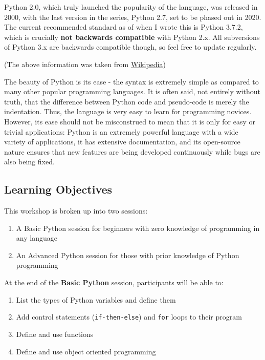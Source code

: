 \documentclass[12pt]{article}
\newcommand{\code}{\texttt}
\begin{document}
Python 2.0, which truly launched the popularity of the language, was released in 2000, with the last version in the series, Python 2.7, set to be phased out in 2020. The current recommended standard as of when I wrote this is Python 3.7.2, which is crucially \textbf{not backwards compatible} with Python 2.x. All subversions of Python 3.x are backwards compatible though, so feel free to update regularly.

(The above information was taken from \href{https://en.wikipedia.org/wiki/Python_(programming_language)}{Wikipedia})

The beauty of Python is its ease - the syntax is extremely simple as compared to many other popular programming languages. It is often said, not entirely without truth, that the difference between Python code and pseudo-code is merely the indentation. Thus, the language is very easy to learn for programming novices. However, its ease should not be misconstrued to mean that it is only for easy or trivial applications: Python is an extremely powerful language with a wide variety of applications, it has extensive documentation, and its open-source nature ensures that new features are being developed continuously while bugs are also being fixed.

\subsection{Learning Objectives}
This workshop is broken up into two sessions:

\begin{enumerate}
	\item A Basic Python session for beginners with zero knowledge of programming in any language
	\item An Advanced Python session for those with prior knowledge of Python programming
\end{enumerate}

At the end of the \textbf{Basic Python} session, participants will be able to:

\begin{enumerate}
	\item List the types of Python variables and define them
	\item Add control statements (\code{if-then-else}) and \code{for} loops to their program
	\item Define and use functions
	\item Define and use object oriented programming
\end{enumerate}
\end{document}
